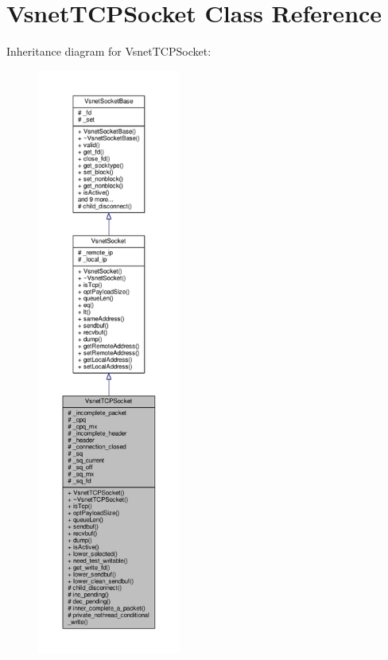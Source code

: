 \hypertarget{classVsnetTCPSocket}{}\section{Vsnet\+T\+C\+P\+Socket Class Reference}
\label{classVsnetTCPSocket}


Inheritance diagram for Vsnet\+T\+C\+P\+Socket\+:
\nopagebreak
\begin{figure}[H]
\begin{center}
\leavevmode
\includegraphics[height=550pt]{da/db2/classVsnetTCPSocket__inherit__graph}
\end{center}
\end{figure}


